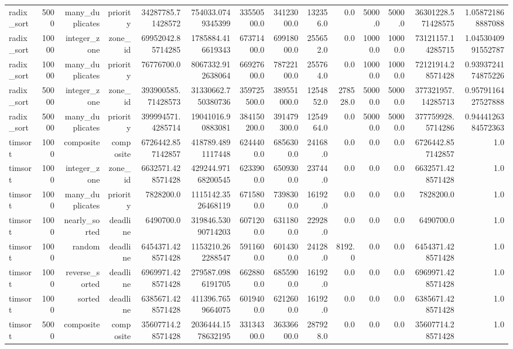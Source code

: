 \begin{table}[htbp]
\begin{tabular}{lrrrrrrrrrrrrr}
radix_sort & 5000 & many_duplicates & priority & 34287785.71428572 & 754033.0749345399 & 33550500.0 & 34123000.0 & 132356.0 & 0.0 & 5000.0 & 5000.0 & 36301228.571428575 & 1.058721868887088 \\
radix_sort & 10000 & integer_zone & zone_id & 69952042.85714285 & 1785884.416619343 & 67371400.0 & 69918000.0 & 255652.0 & 0.0 & 10000.0 & 10000.0 & 73121157.14285715 & 1.0453040991552787 \\
radix_sort & 10000 & many_duplicates & priority & 76776700.0 & 8067332.912638064 & 66927600.0 & 78722100.0 & 255764.0 & 0.0 & 10000.0 & 10000.0 & 72121914.28571428 & 0.9393724174875226 \\
radix_sort & 50000 & integer_zone & zone_id & 393900585.71428573 & 31330662.750380736 & 359725500.0 & 389551000.0 & 1254852.0 & 278528.0 & 50000.0 & 50000.0 & 377321957.14285713 & 0.9579116427527888 \\
radix_sort & 50000 & many_duplicates & priority & 399994571.4285714 & 19041016.90883081 & 384150200.0 & 391479300.0 & 1254964.0 & 0.0 & 50000.0 & 50000.0 & 377759928.5714286 & 0.9444126384572363 \\
timsort & 1000 & composite & composite & 6726442.857142857 & 418789.4891117448 & 6244400.0 & 6856300.0 & 24168.0 & 0.0 & 0.0 & 0.0 & 6726442.857142857 & 1.0 \\
timsort & 1000 & integer_zone & zone_id & 6632571.428571428 & 429244.97168200545 & 6233900.0 & 6509300.0 & 23744.0 & 0.0 & 0.0 & 0.0 & 6632571.428571428 & 1.0 \\
timsort & 1000 & many_duplicates & priority & 7828200.0 & 1115142.3526468119 & 6715800.0 & 7398300.0 & 16192.0 & 0.0 & 0.0 & 0.0 & 7828200.0 & 1.0 \\
timsort & 1000 & nearly_sorted & deadline & 6490700.0 & 319846.53090714203 & 6071200.0 & 6311800.0 & 22928.0 & 0.0 & 0.0 & 0.0 & 6490700.0 & 1.0 \\
timsort & 1000 & random & deadline & 6454371.428571428 & 1153210.262288547 & 5911600.0 & 6014300.0 & 24128.0 & 8192.0 & 0.0 & 0.0 & 6454371.428571428 & 1.0 \\
timsort & 1000 & reverse_sorted & deadline & 6969971.428571428 & 279587.0986191705 & 6628800.0 & 6855900.0 & 16192.0 & 0.0 & 0.0 & 0.0 & 6969971.428571428 & 1.0 \\
timsort & 1000 & sorted & deadline & 6385671.428571428 & 411396.7659664075 & 6019400.0 & 6212600.0 & 16192.0 & 0.0 & 0.0 & 0.0 & 6385671.428571428 & 1.0 \\
timsort & 5000 & composite & composite & 35607714.28571428 & 2036444.1578632195 & 33134300.0 & 36336600.0 & 287928.0 & 0.0 & 0.0 & 0.0 & 35607714.28571428 & 1.0 \\

\end{tabular}
\end{table}
